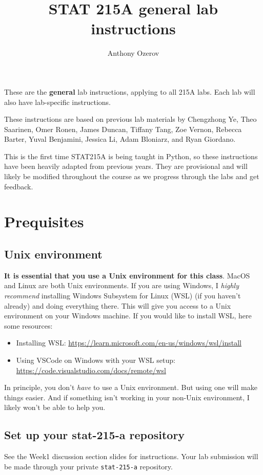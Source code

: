 \documentclass[letterpaper,12pt]{article}
\title{STAT 215A general lab instructions\vspace{-1em}}
\author{Anthony Ozerov}
\begin{document}
\maketitle

These are the \textbf{general} lab instructions, applying to all 215A labs. Each lab will also have lab-specific instructions.

\tableofcontents

These instructions are based on previous lab materials by Chengzhong Ye, Theo Saarinen, Omer Ronen, James Duncan, Tiffany Tang, Zoe Vernon, Rebecca Barter, Yuval Benjamini, Jessica Li, Adam Bloniarz, and Ryan Giordano.

This is the first time STAT215A is being taught in Python, so these instructions have been heavily adapted from previous years. They are provisional and will likely be modified throughout the course as we progress through the labs and get feedback.

\section{Prequisites}
\subsection{Unix environment}
\textbf{It is essential that you use a Unix environment for this class}. MacOS and Linux are both Unix environments. If you are using Windows, I \textit{highly recommend} installing Windows Subsystem for Linux (WSL) (if you haven't already) and doing everything there. This will give you access to a Unix environment on your Windows machine. If you would like to install WSL, here some resources:
\begin{itemize}
    \item Installing WSL: \url{https://learn.microsoft.com/en-us/windows/wsl/install}
    \item Using VSCode on Windows with your WSL setup: \url{https://code.visualstudio.com/docs/remote/wsl}
\end{itemize}
In principle, you don't \textit{have} to use a Unix environment. But using one will make things easier. And if something isn't working in your non-Unix environment, I likely won't be able to help you.
\subsection{Set up your stat-215-a repository}
See the Week1 discussion section slides for instructions. Your lab submission will be made through your private \texttt{stat-215-a} repository.
\end{document}
